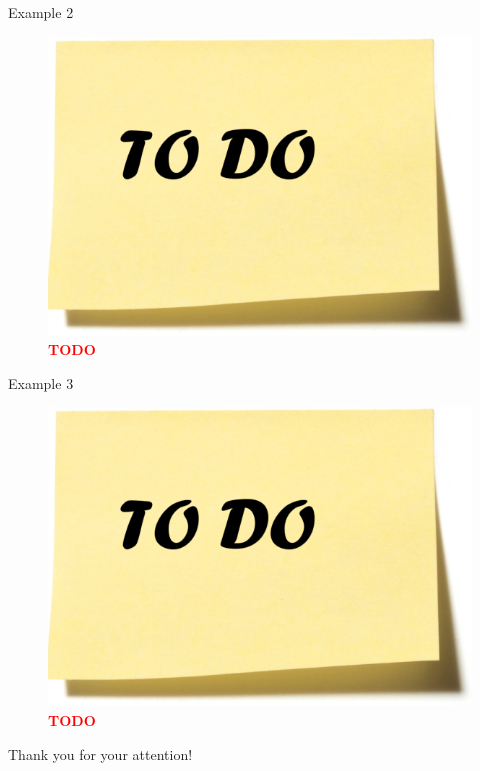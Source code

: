 \documentclass[]{beamer}
\newcommand{\TODO}{\textbf{\textcolor{red}{TODO}}} %
\begin{document}
  \begin{frame}{Example 2}
      \begin{figure}
        \includegraphics[width=.5\textwidth,height=.5\textheight,keepaspectratio]{img/todo.png}
        \caption{\TODO}
      \end{figure}
    \end{frame}

  \begin{frame}{Example 3}
      \begin{figure}
        \includegraphics[width=.5\textwidth,height=.5\textheight,keepaspectratio]{img/todo.png}
        \caption{\TODO}
      \end{figure}
    \end{frame}


\begin{frame}[plain]
  \vspace{20mm}
  \centerline{Thank you for your attention!}
\end{frame}
\end{document}
